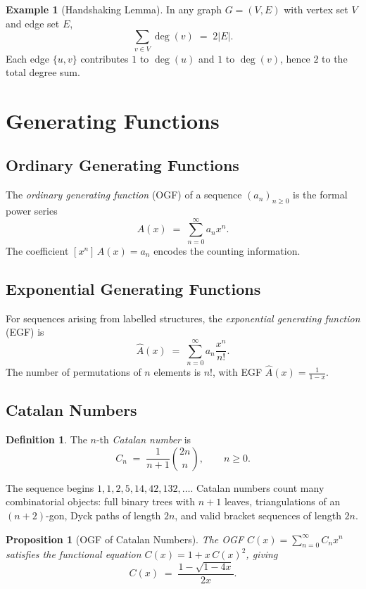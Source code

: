 \documentclass[12pt,a4paper]{amsart}
\newtheorem{proposition}[theorem]{Proposition}
\theoremstyle{definition}
\newtheorem{definition}[theorem]{Definition}
\newtheorem{example}[theorem]{Example}
\theoremstyle{remark}
\begin{document}
\begin{example}[Handshaking Lemma]
In any graph $G = (V,E)$ with vertex set $V$ and edge set $E$,
\[
  \sum_{v \in V} \deg(v) \;=\; 2|E|.
\]
Each edge $\{u,v\}$ contributes $1$ to $\deg(u)$ and $1$ to $\deg(v)$, hence
$2$ to the total degree sum.
\end{example}

\section{Generating Functions}

\subsection{Ordinary Generating Functions}

The \emph{ordinary generating function} (OGF) of a sequence $(a_n)_{n \ge 0}$ is
the formal power series
\[
  A(x) \;=\; \sum_{n=0}^{\infty} a_n x^n.
\]
The coefficient $[x^n]\,A(x) = a_n$ encodes the counting information.

\subsection{Exponential Generating Functions}

For sequences arising from labelled structures, the \emph{exponential generating
function} (EGF) is
\[
  \hat{A}(x) \;=\; \sum_{n=0}^{\infty} a_n \frac{x^n}{n!}.
\]
The number of permutations of $n$ elements is $n!$, with EGF $\hat{A}(x) =
\frac{1}{1-x}$.

\subsection{Catalan Numbers}

\begin{definition}
The $n$-th \emph{Catalan number} is
\[
  C_n \;=\; \frac{1}{n+1}\binom{2n}{n}, \qquad n \ge 0.
\]
\end{definition}

The sequence begins $1, 1, 2, 5, 14, 42, 132, \ldots$.  Catalan numbers count
many combinatorial objects: full binary trees with $n+1$ leaves, triangulations
of an $(n+2)$-gon, Dyck paths of length $2n$, and valid bracket sequences of
length $2n$.

\begin{proposition}[OGF of Catalan Numbers]
The OGF $C(x) = \sum_{n=0}^{\infty} C_n x^n$ satisfies the functional equation
$C(x) = 1 + x\,C(x)^2$, giving
\[
  C(x) \;=\; \frac{1 - \sqrt{1-4x}}{2x}.
\]
\end{proposition}
\end{document}
